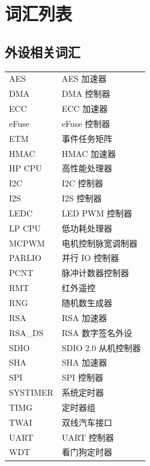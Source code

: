 \section*{词汇列表}\label{glossary}
\rhead{\Navigation}

\subsection*{外设相关词汇}

\begin{longtable}[c]{p{3cm}p{12cm} }

AES & AES 加速器 \\ 
DMA & DMA 控制器 \\
ECC & ECC 加速器 \\
eFuse & eFuse 控制器 \\
ETM & 事件任务矩阵 \\
HMAC & HMAC 加速器 \\
HP CPU & 高性能处理器 \\ 
I2C & I2C 控制器 \\
I2S & I2S 控制器 \\
LEDC & LED PWM 控制器 \\ 
LP CPU & 低功耗处理器 \\ 
MCPWM & 电机控制脉宽调制器 \\ 
PARLIO & 并行 IO 控制器 \\ 
PCNT & 脉冲计数器控制器 \\
RMT & 红外遥控 \\
RNG & 随机数生成器 \\
RSA & RSA 加速器 \\
RSA\_DS & RSA 数字签名外设 \\
SDIO & SDIO 2.0 从机控制器 \\ 
SHA & SHA 加速器 \\
SPI & SPI 控制器 \\
SYSTIMER & 系统定时器  \\
TIMG & 定时器组 \\
TWAI & 双线汽车接口 \\
UART & UART 控制器 \\
WDT & 看门狗定时器 \\ 

\end{longtable}




